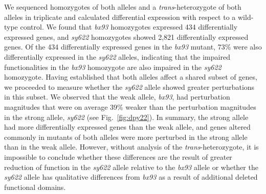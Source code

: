 \documentclass[10pt, onecolumn]{article}
\newcommand{\strongn}{2,821}
\newcommand{\weakn}{434}
\begin{document}
We sequenced homozygotes of both alleles and a \emph{trans}-heterozygote of both
alleles in triplicate and calculated differential expression with respect to a
wild-type control. We found that \emph{bx93} homozygotes expressed \weakn{}
differentially expressed genes, and \emph{sy622} homozygotes showed \strongn{}
differentially expressed genes. Of the \weakn{} differentially expressed genes
in the \emph{bx93} mutant, 73\% were also differentially expressed in the
\emph{sy622} alleles, indicating that the impaired functionalities in the
\emph{bx93} homozygote are also impaired in the \emph{sy622} homozygote. Having
established that both alleles affect a shared subset of genes, we proceeded to
measure whether the \emph{sy622} allele showed greater perturbations in this
subset. We observed that the weak allele, \emph{bx93}, had perturbation
magnitudes that were on average 39\% weaker than the perturbation magnitudes in
the strong allele, \emph{sy622} (see Fig.~\ref{fig:dpy22}). In summary, the
strong allele had more differentially expressed genes than the weak allele, and
genes altered commonly in mutants of both alleles were more perturbed in the
strong allele than in the weak allele. However, without analysis of the
\emph{trans}-heterozygote, it is impossible to conclude whether these differences
are the result of greater reduction of function in the \emph{sy622} allele
relative to the \emph{bx93} allele or whether the \emph{sy622} allele has
qualitative differences from \emph{bx93} as a result of additional deleted
functional domains.
\end{document}
